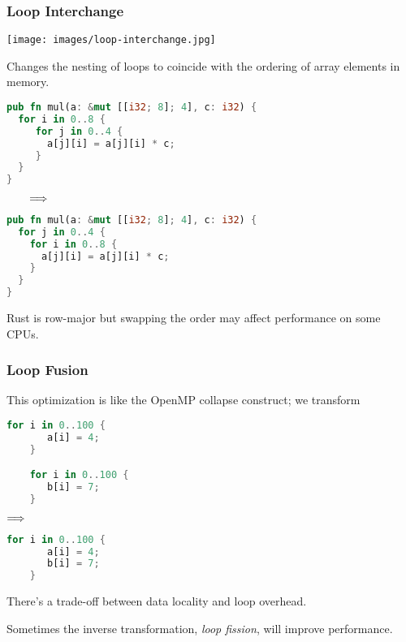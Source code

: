 \begin{frame}[fragile]
\frametitle{Loop Interchange}

\begin{center}
	\texttt{[image: images/loop-interchange.jpg]}
\end{center}

Changes the nesting of loops to
coincide with the ordering of array elements in memory. 


\begin{center}
\vspace*{-1em}
\begin{minipage}{.39\textwidth}
  \begin{lstlisting}[language=Rust]
pub fn mul(a: &mut [[i32; 8]; 4], c: i32) {
  for i in 0..8 {
     for j in 0..4 {
       a[j][i] = a[j][i] * c;
     }
  }
}
  \end{lstlisting}
  \end{minipage} $\hspace*{2em} \Longrightarrow \hspace*{2em}$ \begin{minipage}{.4\textwidth}
  \begin{lstlisting}[language=Rust]
pub fn mul(a: &mut [[i32; 8]; 4], c: i32) {
  for j in 0..4 {
    for i in 0..8 {
      a[j][i] = a[j][i] * c;
    }
  }
}
  \end{lstlisting}
  \end{minipage}
  \end{center}
  Rust is row-major but swapping the order may affect performance on some CPUs.
  
\end{frame}

\begin{frame}[fragile]
\frametitle{Loop Fusion}

This optimization is like the OpenMP collapse
construct; we transform
\begin{center}
\vspace*{-1em}
\begin{minipage}{.3\textwidth}
  \begin{lstlisting}[language=Rust]
    for i in 0..100 {
       a[i] = 4;
    }

    for i in 0..100 {
       b[i] = 7;
    }
  \end{lstlisting}
  \end{minipage} $\Longrightarrow \hspace*{2em}$ \begin{minipage}{.4\textwidth}
  \begin{lstlisting}[language=Rust]
    for i in 0..100 {
       a[i] = 4;
       b[i] = 7;
    }
  \end{lstlisting}
  \end{minipage}
  \end{center}
There's a trade-off between data locality and loop overhead.

Sometimes the inverse transformation, \emph{loop fission}, will
improve performance.

\end{frame}

